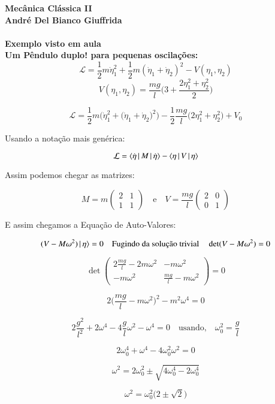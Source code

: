 \documentclass[a4paper,11pt]{exam}
\begin{document}
\begingroup
	  \bf \Large Mecânica Clássica II\\
	  \indent \normalsize André Del Bianco Giuffrida
	\endgroup
	\\ \quad
	\\
	\large{Exemplo visto em aula}
	\\
	Um Pêndulo duplo! para pequenas oscilações:
	\normalsize
	\[ \mathcal{L} = \frac{1}{2}m\dot\eta_1^2 + \frac{1}{2}m(\dot\eta_1 + \dot\eta_2)^2 - V(\eta_1,\eta_2)\]
	\[ V(\eta_1,\eta_2) = \frac{mg}{l} \Bigg(3 + \frac{2\eta_1^2 + \eta_2^2}{2} \Bigg)\]
	
	\[ \mathcal{L} = \frac{1}{2}m\Bigg( \dot\eta_1^2 + \Big(\dot\eta_1 + \dot\eta_2\Big)^2\Bigg) - \frac{1}{2} \frac{mg}{l}\Big(2\eta_1^2 + \eta_2^2\Big) + V_0\]
	
	Usando a notação mais genérica:
	
	\[ \mathcal{L} = \bra{\dot\eta\,}M\ket{\,\dot\eta} - \bra{\eta\,}V\ket{\,\eta} \]
	
	Assim podemos chegar as matrizes:
	
	\[
	M = m\begin{pmatrix}
		2 & 1 \\
		1 & 1
		\end{pmatrix}
		\quad
		\text{e}
		\quad
	V = \frac{mg}{l}
		\begin{pmatrix}
			2 & 0 \\
			0 & 1
		\end{pmatrix}
	\]
	
	E assim chegamos a Equação de Auto-Valores:
	
	\[(V-M\omega^2)\ket{\,\eta} = 0 \quad \text{Fugindo da solução trivial} \quad \det(V-M\omega^2) = 0\]
	
	\[
	\det \begin{pmatrix}
		2\frac{mg}{l} - 2m\omega^2 & -m\omega^2 \\
		-m\omega^2 & \frac{mg}{l} - m\omega^2
		\end{pmatrix} = 0
	\]
	
	\[ 2 \Big(\frac{mg}{l} - m\omega^2\Big)^2 - m^2\omega^4 = 0 \]
	
	\[ 2\frac{g^2}{l^2} + 2\omega^4 - 4\frac{g}{l}\omega^2 - \omega^4 = 0 \quad \text{usando,}\quad \omega_0^2 = \frac{g}{l}\]
	
	\[ 2\omega_0^4 + \omega^4 - 4\omega_0^2\omega^2 = 0\]
	
	\[ \omega^2 = 2\omega_0^2 \pm \sqrt{4\omega_0^4 - 2\omega_0^4} \]
	
	\[ \omega^2 =\omega_0^2\Big(2 \pm \sqrt{2}\Big) \]
	
\end{document}
